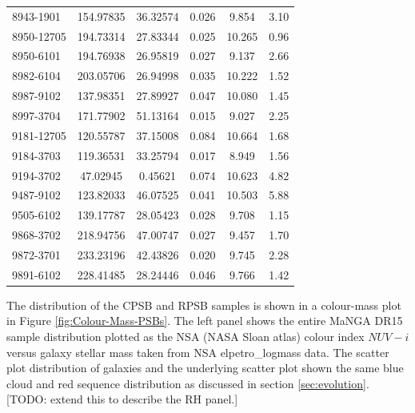 \begin{table}[h]
\begin{tabular}{lccccc}
8943-1901 & 154.97835 & 36.32574 & 0.026 & 9.854 & 3.10 \\
8950-12705 & 194.73314 & 27.83344 & 0.025 & 10.265 & 0.96 \\
8950-6101 & 194.76938 & 26.95819 & 0.027 & 9.137 & 2.66 \\
8982-6104 & 203.05706 & 26.94998 & 0.035 & 10.222 & 1.52 \\
8987-9102 & 137.98351 & 27.89927 & 0.047 & 10.080 & 1.45 \\
8997-3704 & 171.77902 & 51.13164 & 0.015 & 9.027 & 2.25 \\
9181-12705 & 120.55787 & 37.15008 & 0.084 & 10.664 & 1.68 \\
9184-3703 & 119.36531 & 33.25794 & 0.017 & 8.949 & 1.56 \\
9194-3702 & 47.02945 & 0.45621 & 0.074 & 10.623 & 4.82 \\
9487-9102 & 123.82033 & 46.07525 & 0.041 & 10.503 & 5.88 \\
9505-6102 & 139.17787 & 28.05423 & 0.028 & 9.708 & 1.15 \\
9868-3702 & 218.94756 & 47.00747 & 0.027 & 9.457 & 1.70 \\
9872-3701 & 233.23196 & 42.43826 & 0.020 & 9.745 & 2.28 \\
9891-6102 & 228.41485 & 28.24446 & 0.046 & 9.766 & 1.42 \\
\hline
\end{tabular}
\end{table}

The distribution of the CPSB and RPSB samples is shown in a colour-mass plot in Figure \ref{fig:Colour-Mass-PSBs}. The left panel shows the entire MaNGA DR15 sample distribution plotted as the NSA (NASA Sloan atlas) colour index $NUV - i$ versus galaxy stellar mass taken from NSA elpetro\_logmass data. The scatter plot distribution of galaxies and the underlying scatter plot shown the same blue cloud and red sequence distribution as discussed in section \ref{sec:evolution}. [TODO: extend this to describe the RH panel.]

